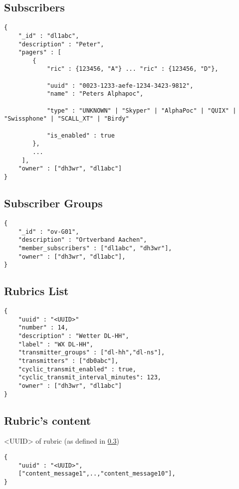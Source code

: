  
\subsection{Subscribers}
\begin{lstlisting}
{
	"_id" : "dl1abc",
	"description" : "Peter",
	"pagers" : [
		{
    		"ric" : {123456, "A"} ... "ric" : {123456, "D"},

			"uuid" : "0023-1233-aefe-1234-3423-9812",
    		"name" : "Peters Alphapoc",

			"type" : "UNKNOWN" | "Skyper" | "AlphaPoc" | "QUIX" | "Swissphone" | "SCALL_XT" | "Birdy"

			"is_enabled" : true
     	},
     	...
     ],
    "owner" : ["dh3wr", "dl1abc"]
}
\end{lstlisting}

\subsection{Subscriber Groups}

\begin{lstlisting}
{
	"_id" : "ov-G01",
	"description" : "Ortverband Aachen",
	"member_subscribers" : ["dl1abc", "dh3wr"],
    "owner" : ["dh3wr", "dl1abc"],
}
\end{lstlisting}

\subsection{Rubrics List}
\label{rubric_list}

\begin{lstlisting}
{
   	"uuid" : "<UUID>"
    "number" : 14,
    "description" : "Wetter DL-HH",
    "label" : "WX DL-HH",
    "transmitter_groups" : ["dl-hh","dl-ns"],
    "transmitters" : ["db0abc"],
	"cyclic_transmit_enabled" : true,
    "cyclic_transmit_interval_minutes": 123,
 	"owner" : ["dh3wr", "dl1abc"]
}
\end{lstlisting}

\subsection{Rubric's content}
<UUID> of rubric (as defined in \ref{rubric_list})

\begin{lstlisting}
{
	"uuid" : "<UUID>",
	["content_message1",..,"content_message10"],
}
\end{lstlisting}
